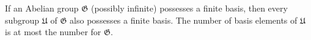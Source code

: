 If an Abelian group $\mathfrak{G}$ (possibly infinite) possesses a finite basis, then every subgroup $\mathfrak{U}$ of $\mathfrak{G}$ also possesses a finite basis. The number of basis elements of $\mathfrak{U}$ is at most the number for $\mathfrak{G}$.
